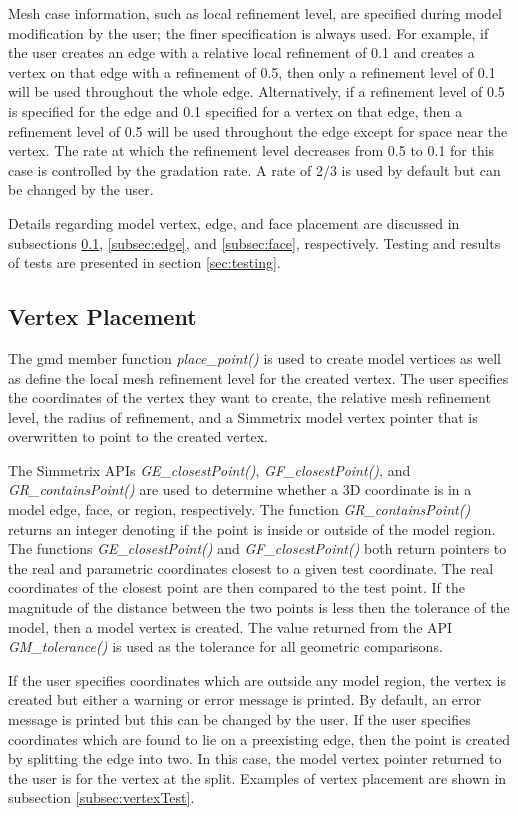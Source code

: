 \documentclass[a4paper, 12pt]{article}
\begin{document}
Mesh case information, such as local refinement level, are
specified during model modification by the user; the finer
specification is always used. For example, if the user 
creates an edge with a relative local refinement of 0.1
and creates a vertex on that edge with a refinement of 0.5, 
then only a refinement level of 0.1 will be used throughout 
the whole edge. Alternatively, if a refinement level of 0.5 
is specified for the edge and 0.1 specified for a vertex on that
edge, then a refinement level of 0.5 will be used throughout the 
edge except for space near the vertex. The rate at which the 
refinement level decreases from 0.5 to 0.1 for this case is controlled
by the gradation rate. A rate of 2/3 is used by default 
but can be changed by the user. 

Details regarding model vertex, edge, and face placement are 
discussed in subsections \ref{subsec:vertex}, \ref{subsec:edge}, 
and \ref{subsec:face}, respectively. Testing and results of tests
are presented in section \ref{sec:testing}.

\subsection{Vertex Placement} \label{subsec:vertex}
The gmd member function \emph{place\_point()} is used to create model
vertices as well as define the local mesh refinement level
for the created vertex.
The user specifies the coordinates of the vertex they want to create, the 
relative mesh refinement level, the radius of refinement, and a Simmetrix
model vertex pointer that is overwritten to point to the created vertex. 

The Simmetrix APIs \emph{GE\_closestPoint()}, \emph{GF\_closestPoint()}, 
and \emph{GR\_containsPoint()} are used to determine whether 
a 3D coordinate is in a model edge, face, or region, respectively. 
The function \emph{GR\_containsPoint()}
returns an integer denoting if the point 
is inside or outside of the model region. 
The functions \emph{GE\_closestPoint()} 
and \emph{GF\_closestPoint()} both return 
pointers to the real and parametric coordinates closest
to a given test coordinate. 
The real coordinates of the closest point are 
then compared to the test point.
If the magnitude of the distance between the two points is less then the 
tolerance of the model, then a model vertex is created. 
The value returned from the API \emph{GM\_tolerance()} is used as the 
tolerance for all geometric comparisons. 

If the user specifies coordinates
which are outside any model region, the vertex is created but either a 
warning or error message is printed. By default, an error message is printed
but this can be changed by the user. If the user specifies coordinates 
which are found to lie on a preexisting edge, then the point is created
by splitting the edge into two. In this case, the model vertex pointer
returned to the user is for the vertex at the split.
Examples of vertex placement are shown in 
subsection \ref{subsec:vertexTest}.
\end{document}
